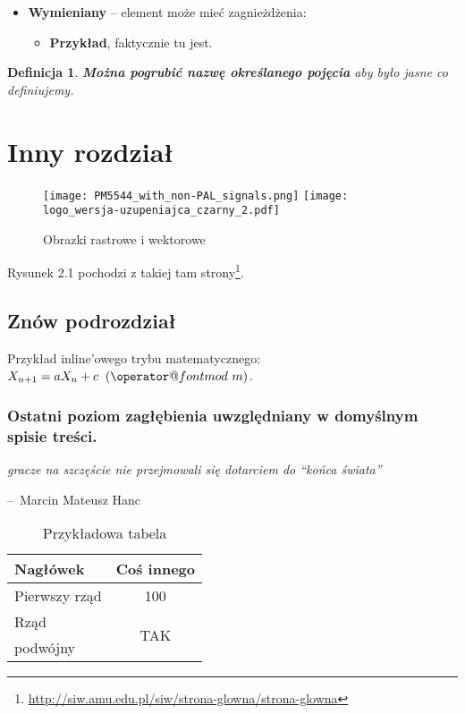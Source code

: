 \documentclass[12pt,a4paper,leqno,oneside,titlepage]{book}
\makeatletter
\def\imod#1{\allowbreak\mkern10mu({\operator@font mod}\,\,#1)}
\newtheorem{mydef}{Definicja}
\newenvironment{chapquote}[2][2em]
  {\setlength{\@tempdima}{#1}%
   \def\chapquote@author{#2}%
   \parshape 1 \@tempdima \dimexpr\textwidth-2\@tempdima\relax%
   \itshape}
  {\par\normalfont\hfill--\ \chapquote@author\hspace*{\@tempdima}\par\bigskip}
\makeatother
\begin{document}
\begin{itemize}
\item \textbf{Wymieniany} -- element może mieć zagnieżdżenia:
    \begin{itemize}
    \item \textbf{Przykład}, faktycznie tu jest.
    \end{itemize}
\end{itemize}

\begin{mydef}
\textbf{Można pogrubić nazwę określanego pojęcia} aby było jasne co definiujemy.
\end{mydef}

\chapter{Inny rozdział}

\begin{figure}[h!]
  \centering
    \texttt{[image: PM5544\_with\_non-PAL\_signals.png]}
    \texttt{[image: logo\_wersja-uzupeniajca\_czarny\_2.pdf]}
  \caption{Obrazki rastrowe i wektorowe}
\end{figure}

Rysunek 2.1 pochodzi z takiej tam strony\footnote{\url{http://siw.amu.edu.pl/siw/strona-glowna/strona-glowna}}.

\section{Znów podrozdział}

Przykład inline'owego trybu matematycznego: $X_{n+1} = a X_n + c \imod{m}$.

\subsection{Ostatni poziom zagłębienia uwzględniany w domyślnym spisie treści.}

\begin{chapquote}{Marcin Mateusz Hanc}
gracze na szczęście nie przejmowali się dotarciem do ``końca świata'' \cite{Hanc15szumy}
\end{chapquote}

\begin{table}[h]
\centering
\label{tab:RNG_examples}
\begin{tabular}{l|c}
 Nagłówek & Coś innego \\
 \hline \hline
 Pierwszy rząd & 100 \\
 \hline
 Rząd & \multirow{2}{*}{TAK} \\
 podwójny & \\
\end{tabular}
\caption{Przykładowa tabela}
\end{table}
\end{document}
